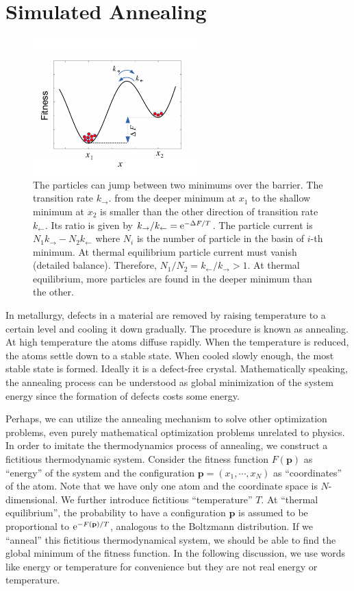 \section{Simulated Annealing}

\begin{figure}
\centering
\includegraphics[width=2.5in]{19.Optimization/sa.pdf}
\caption{The particles can jump between two minimums over the barrier. The transition rate $k_\rightarrow.$ from the deeper minimum at $x_1$ to the shallow minimum at $x_2$ is smaller than the other direction of transition rate $k_\leftarrow$.  Its ratio is given by $k_\rightarrow/k_\leftarrow = \text{e}^{-\Delta F/T}$. The particle current is $N_1 k_\rightarrow - N_2 k_\leftarrow$ where $N_i$ is the number of particle in the basin of $i$-th minimum. At thermal equilibrium particle current must vanish (detailed balance). Therefore, $N_1/N_2 = k_\leftarrow/k_\rightarrow > 1$.  At thermal equilibrium, more particles are found in the deeper minimum than the other.}
\label{fig:sa}
\end{figure}

In metallurgy,  defects in a material are removed by raising temperature to a certain level and cooling it down gradually.  The procedure is known as annealing.  At high temperature the atoms diffuse rapidly.  When the temperature is reduced, the atoms settle down to a stable state. When cooled slowly enough, the most stable state is formed.  Ideally it is a defect-free crystal.  Mathematically speaking, the annealing process can be understood as global minimization of the system energy since the formation of defects costs some energy. 

Perhaps, we can utilize the annealing mechanism to solve other optimization problems, even purely mathematical optimization problems unrelated to physics.  In order to imitate the  thermodynamics process of annealing, we construct a fictitious thermodynamic system.  Consider the fitness function $F(\mathbf{p})$ as ``energy'' of the system and the configuration $\mathbf{p}=(x_1, \cdots, x_N)$ as ``coordinates'' of the atom. 
Note that we have only one atom and the coordinate space is $N$-dimensional. We further introduce fictitious ``temperature'' $T$.  At ``thermal equilibrium'', the probability to have a configuration $\mathbf{p}$ is assumed to be proportional to $\text{e}^{-F(\mathbf{p})/T}$, analogous to the Boltzmann distribution.  If we ``anneal'' this fictitious thermodynamical system, we should be able to find the global minimum of the fitness function.  In the following discussion, we use words like energy or temperature for convenience but they are not real energy or temperature.  

